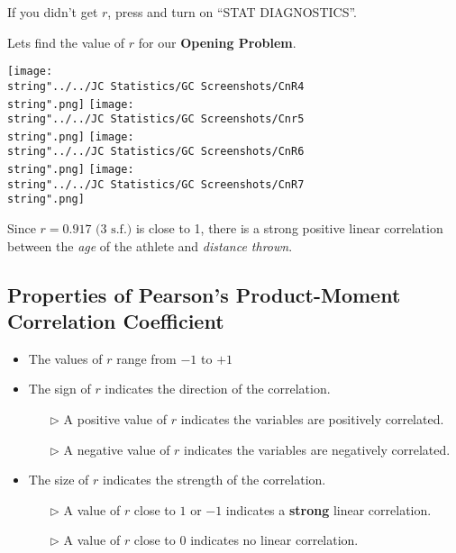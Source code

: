 \documentclass[11pt,a4paper]{book}
\begin{document}
If you didn't get $r$, press \tcbox[box align=base,nobeforeafter,colback=black, colframe=black,size=small]{\textbf{\textcolor{white}{mode}}}
and turn on ``STAT DIAGNOSTICS\textquotedblright .

Lets find the value of $r$ for our \textbf{Opening Problem}.
\begin{center}

\texttt{[image: \\string"../../JC Statistics/GC Screenshots/CnR4\\string".png]}
\texttt{[image: \\string"../../JC Statistics/GC Screenshots/Cnr5\\string".png]}
\texttt{[image: \\string"../../JC Statistics/GC Screenshots/CnR6\\string".png]}
\texttt{[image: \\string"../../JC Statistics/GC Screenshots/CnR7\\string".png]}
\par\end{center}

Since $r=0.917\text{ (3 s.f.)}$ is close to 1, there is a strong
positive linear correlation between the \textit{age} of the athlete
and \textit{distance thrown}.

\newpage

\subsection{Properties of Pearson's Product-Moment Correlation Coefficient}

\begin{itemize}

\item The values of $r$ range from $-1$ to $+1$

\item The sign of $r$ indicates the direction of the correlation.

\begin{itemize}

\item[$\triangleright$]  A positive value of $r$ indicates the variables
are positively correlated.

\item[$\triangleright$]  A negative value of $r$ indicates the variables
are negatively correlated.

\end{itemize}

\item  The size of $r$ indicates the strength of the correlation.

\begin{itemize}

\item[$\triangleright$]  A value of $r$ close to $1$ or $-1$ indicates
a \textbf{strong} linear correlation.

\item[$\triangleright$]  A value of $r$ close to $0$ indicates
no linear correlation.

\end{itemize}

\end{itemize}
\end{document}
